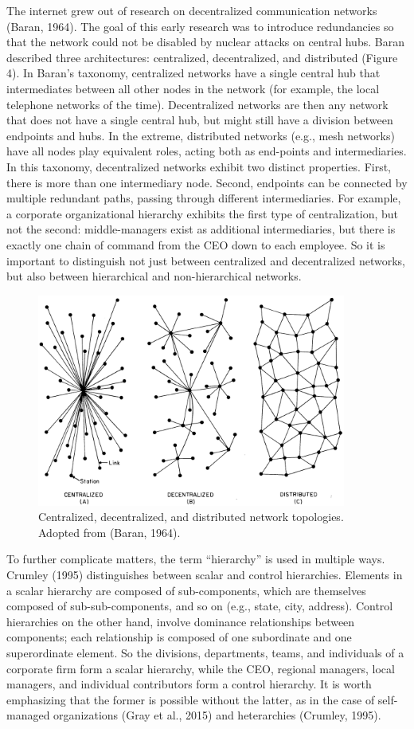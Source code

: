 The internet grew out of research on decentralized communication networks (Baran, 1964). The goal of this early research was to introduce redundancies so that the network could not be disabled by nuclear attacks on central hubs. Baran described three architectures: centralized, decentralized, and distributed (Figure 4). In Baran's taxonomy, centralized networks have a single central hub that intermediates between all other nodes in the network (for example, the local telephone networks of the time). Decentralized networks are then any network that does not have a single central hub, but might still have a division between endpoints and hubs. In the extreme, distributed networks (e.g., mesh networks) have all nodes play equivalent roles, acting both as end-points and intermediaries. In this taxonomy, decentralized networks exhibit two distinct properties. First, there is more than one intermediary node. Second, endpoints can be connected by multiple redundant paths, passing through different intermediaries. For example, a corporate organizational hierarchy exhibits the first type of centralization, but not the second: middle-managers exist as additional intermediaries, but there is exactly one chain of command from the CEO down to each employee. So it is important to distinguish not just between centralized and decentralized networks, but also between hierarchical and non-hierarchical networks.

\begin{figure}
\centering
\includegraphics[width=4in]{images/fig-decentralized.png}
\caption{
Centralized, decentralized, and distributed network topologies. Adopted from (Baran, 1964).
\label{fig:decentralization}
}
\end{figure}


To further complicate matters, the term “hierarchy” is used in multiple ways. Crumley (1995) distinguishes between scalar and control hierarchies. Elements in a scalar hierarchy are composed of sub-components, which are themselves composed of sub-sub-components, and so on (e.g., state, city, address). Control hierarchies on the other hand, involve dominance relationships between components; each relationship is composed of one subordinate and one superordinate element. So the divisions, departments, teams, and individuals of a corporate firm form a scalar hierarchy, while the CEO, regional managers, local managers, and individual contributors form a control hierarchy. It is worth emphasizing that the former is possible without the latter, as in the case of self-managed organizations (Gray et al., 2015) and heterarchies (Crumley, 1995).


